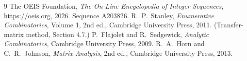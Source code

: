 \documentclass[11pt,a4paper]{article}
\theoremstyle{plain}
\theoremstyle{definition}
\begin{document}
\begin{thebibliography}{9}
 The OEIS Foundation, \emph{The On-Line Encyclopedia of Integer
Sequences}, \url{https://oeis.org}, 2026. Sequence A203826.
 R.~P.~Stanley, \emph{Enumerative Combinatorics}, Volume 1, 2nd ed.,
Cambridge University Press, 2011. (Transfer-matrix method, Section 4.7.)
 P.~Flajolet and R.~Sedgewick, \emph{Analytic Combinatorics}, Cambridge
University Press, 2009.
 R.~A.~Horn and C.~R.~Johnson, \emph{Matrix Analysis}, 2nd ed., Cambridge
University Press, 2013.
\end{thebibliography}
\end{document}
